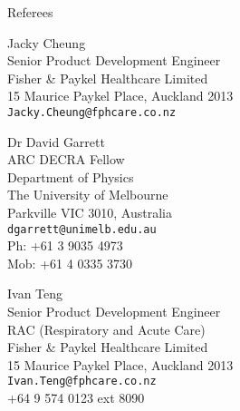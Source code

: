 \documentclass[11pt]{tracv}
\begin{document}
\begin{columnsection}{Referees}

\begin{multicols}{2}

    	Jacky Cheung\\
	Senior Product Development Engineer\\ 
	Fisher \& Paykel Healthcare Limited\\
	15 Maurice Paykel Place, Auckland 2013\\ 
	\texttt{Jacky.Cheung@fphcare.co.nz}\\

	\vspace{0.25cm}

	Dr David Garrett\\
	ARC DECRA Fellow\\
	Department of Physics\\
	The University of Melbourne\\
	Parkville VIC 3010, Australia\\
	\texttt{dgarrett@unimelb.edu.au}\\
	Ph: +61 3 9035 4973\\
	Mob: +61 4 0335 3730\\

	\vspace{0.25cm}
	\columnbreak

	Ivan Teng\\
	Senior Product Development Engineer\\
	RAC (Respiratory and Acute Care)\\
	Fisher \& Paykel Healthcare Limited\\
	15 Maurice Paykel Place, Auckland 2013\\
	\texttt{Ivan.Teng@fphcare.co.nz}\\
	+64 9 574 0123 ext 8090\\

\end{multicols}

\end{columnsection}
\end{document}
